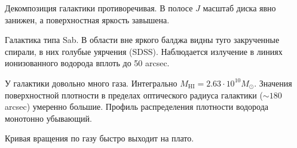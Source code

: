 \documentclass[english,10pt]{article}
\def\mm{\mathrm}
\begin{document}
\bigskip
\noindent
Декомпозиция галактики противоречивая. В полосе $J$ масштаб 
диска явно занижен, а поверхностная яркость завышена.

\bigskip
\noindent
Галактика типа Sab. 
В области вне яркого балджа видны туго закрученные спирали, в них 
голубые уярчения (SDSS). 
Наблюдается излучение в линиях ионизованного водорода 
вплоть до 50 arcsec.

\bigskip
\noindent
У галактики довольно много газа. 
Интегрально $M_\mm{HI} = 2.63 \cdot 10^{10} M_\odot$. 
Значения поверхностной плотности в пределах оптического 
радиуса галактики ($\sim 180$ arcsec) умеренно большие.
Профиль распределения плотности водорода монотонно убывающий.

\bigskip
\noindent
Кривая вращения по газу быстро выходит на плато.
\end{document}
